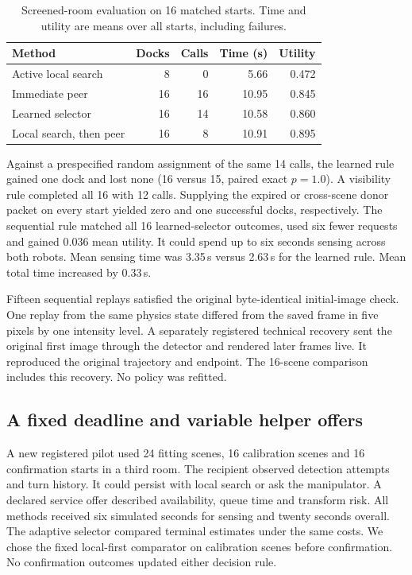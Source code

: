 \documentclass[conference]{IEEEtran}
\begin{document}
\begin{table}[t]
\centering\caption{Screened-room evaluation on 16 matched starts. Time and utility are means over all starts, including failures.}
\begin{tabular}{lrrrr}\hline
Method & Docks & Calls & Time (s) & Utility \\\hline
Active local search & 8 & 0 & 5.66 & 0.472 \\
Immediate peer & 16 & 16 & 10.95 & 0.845 \\
Learned selector & 16 & 14 & 10.58 & 0.860 \\
Local search, then peer & 16 & 8 & 10.91 & 0.895 \\\hline
\end{tabular}
\end{table}

Against a prespecified random assignment of the same 14 calls, the learned rule gained one dock and lost none (16 versus 15, paired exact $p=1.0$). A visibility rule completed all 16 with 12 calls. Supplying the expired or cross-scene donor packet on every start yielded zero and one successful docks, respectively. The sequential rule matched all 16 learned-selector outcomes, used six fewer requests and gained 0.036 mean utility. It could spend up to six seconds sensing across both robots. Mean sensing time was 3.35\,s versus 2.63\,s for the learned rule. Mean total time increased by 0.33\,s.

Fifteen sequential replays satisfied the original byte-identical initial-image check. One replay from the same physics state differed from the saved frame in five pixels by one intensity level. A separately registered technical recovery sent the original first image through the detector and rendered later frames live. It reproduced the original trajectory and endpoint. The 16-scene comparison includes this recovery. No policy was refitted.

\subsection{A fixed deadline and variable helper offers}
A new registered pilot used 24 fitting scenes, 16 calibration scenes and 16 confirmation starts in a third room. The recipient observed detection attempts and turn history. It could persist with local search or ask the manipulator. A declared service offer described availability, queue time and transform risk. All methods received six simulated seconds for sensing and twenty seconds overall. The adaptive selector compared terminal estimates under the same costs. We chose the fixed local-first comparator on calibration scenes before confirmation. No confirmation outcomes updated either decision rule.
\end{document}
